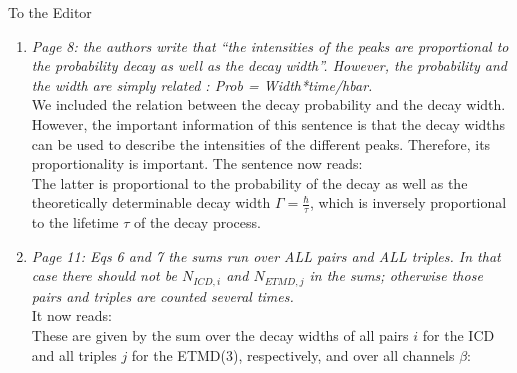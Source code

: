 \documentclass[DIN,pagenumber=false,parskip=half,fromalign=left,fromphone=true,fromemail=true,fromurl=false,fromlogo=false,fromrule=false]{scrlttr2}
\begin{document}
\begin{letter}{To the Editor}
\begin{enumerate}
\begin{enumerate}
   \item \emph{Page 9: the sentence “These atoms do not necessarily need to form bonds...” just rephrases what is already explained earlier in the manuscript on ICD.}
   \item \emph{Page 10: the definition of open and close channel is repeated. Explanations in page 9 and figure 1 are enough.}
   \item \emph{Page :
         the section “Cluster Structures” can be moved to Supporting information since only Table 2 is important to understand the results. Furthermore, it seems to me that the paragraph on previous study of the authors on large clusters does provide relevant informations on the reported results.}
   \item \emph{Page:
         the section Outer valence spectra is very detailed and the reader may lose the main point of this section which is, as far as I understood, to evaluate experimentally the percentage of Xe in the clusters. All extra details can be avoided. Just to help the readers, this section could be renamed to highlight the goal of the section like for example “Xe content”.}
   \item \emph{Page:
         I think the section Inner valence spectra can be skipped without losing any relevant informations.}
  \end{enumerate}

  \item \emph{Page 8:
        the authors write that “the intensities of the peaks are proportional to the probability decay as well as the decay width”. However, the probability and the width are simply related : Prob =  Width*time/hbar.}\\
				
        We included the relation between the decay probability and the decay
        width. However, the important information of this sentence is that
        the decay widths can be used to describe the intensities of the
        different peaks. Therefore, its proportionality is important. The
        sentence now reads:\\
        The latter is proportional to the
probability of the decay {}
as well as the theoretically determinable
decay width $\Gamma=\frac{\hbar}{\tau}$,
which is inversely proportional to the lifetime $\tau$ of the decay process.

  \item \emph{Page 11:
        Eqs 6 and 7 the sums run over ALL pairs and ALL triples. In that case there should not be $N_{ICD,i}$ and $N_{ETMD,j}$ in the sums; otherwise those pairs and triples are counted several times.}\\
        It now reads:\\
        These are given by the sum over the decay widths of all 
        {\color{blue}{geometrically different}} pairs $i$ for the
        ICD and all {\color{blue}{geometrically different}} triples $j$
        for the ETMD(3),
        respectively, and over all channels $\beta$:


\end{enumerate}
\end{letter}
\end{document}
